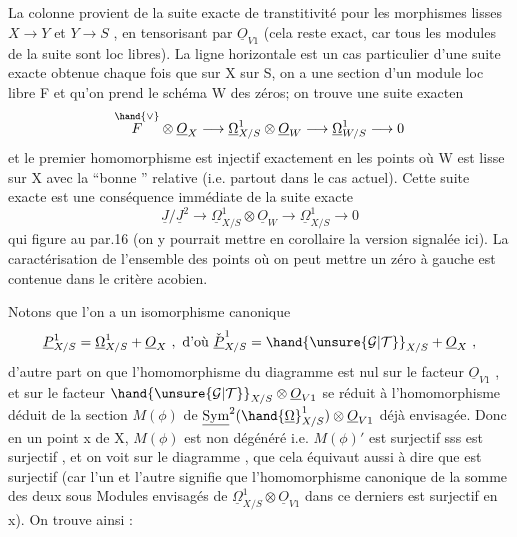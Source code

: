 
La colonne provient de la suite exacte de transtitivité pour les
morphismes lisses $X\to Y$ et $Y\to S$ , en  tensorisant par $\underline{O}_{V1}$ (cela reste
exact, car tous les modules de la suite sont loc libres). La ligne
horizontale est un cas particulier d'une suite exacte obtenue chaque
fois que sur X  sur S, on a une section \unsure{$\phi$} d'un module loc libre F
et qu'on prend le schéma W des zéros; on trouve une suite exacten
\[ \overset{\hand{\vee}}{F}\otimes \underline{O}_X \longrightarrow \underline{\Omega}^1_{X/S}\otimes \underline{O}_W \longrightarrow \underline{\Omega}^1_{W/S} \longrightarrow 0 \]
et  le premier homomorphisme est injectif exactement en les points où
W est lisse sur X avec la ``bonne ''  relative (i.e. partout dans
le cas actuel).  Cette suite exacte est 
  une
conséquence immédiate de la suite exacte
\[ \underline{J}/\underline{J}^2\longrightarrow \underline{\Omega}^1_{X/S}\otimes \underline{O}_W \longrightarrow \underline{\Omega}^1_{X/S} \longrightarrow 0 \]
\margin{16 \textbar} qui figure au par.16 (on y pourrait mettre en corollaire la version
signalée ici). La caractérisation de l'ensemble des points où on
peut mettre un zéro à gauche est contenue dans le critère acobien.

Notons que l'on a un isomorphisme canonique
\[ \underline{P}^1_{X/S} = \underline{\Omega}^1_{X/S} + \underline{O}_X \ ,\ \text{d'où}\ \check{\underline{P}}^1_{X/S} = \hand{\unsure{\mathcal{G}|\mathcal{T}}}_{X/S} + \underline{O}_X \ , \]
d'autre part on  que l'homomorphisme  \hand{$\mu$} du diagramme  est nul
sur le facteur $\underline{O}_{V1}$ , et sur le facteur $\hand{\unsure{\mathcal{G}|\mathcal{T}}}_{X/S}\otimes\underline{O}_{V1}$  se réduit à
l'homomorphisme  déduit de la section $M(\phi)$ de $\underline{\mathrm{Sym}}^2(\hand{\underline{\Omega}}^1_{X/S})\otimes \underline{O}_{V1}$ déjà
envisagée. Donc en un point x de X, $M(\phi)$ est non dégénéré i.e. $M(\phi)'$
est surjectif sss \hand{$\mu$} est surjectif , et on voit sur le diagramme ,
que cela équivaut aussi à dire que \unsure{\hand{$\nu$}} est surjectif  (car l'un et l'autre
signifie que l'homomorphisme canonique de la somme des deux sous
Modules envisagés de $\underline{\Omega}^1_{X/S}\otimes \underline{O}_{V1}$ dans ce derniers est surjectif en
x). On trouve ainsi :

